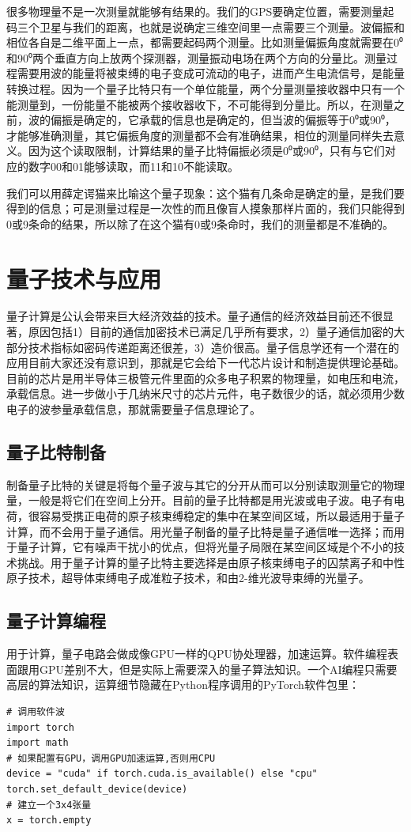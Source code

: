 \documentclass{ctexbook}
\begin{document}
很多物理量不是一次测量就能够有结果的。我们的GPS要确定位置，需要测量起码三个卫星与我们的距离，也就是说确定三维空间里一点需要三个测量。波偏振和相位各自是二维平面上一点，都需要起码两个测量。比如测量偏振角度就需要在0⁰和90⁰两个垂直方向上放两个探测器，测量振动电场在两个方向的分量比。测量过程需要用波的能量将被束缚的电子变成可流动的电子，进而产生电流信号，是能量转换过程。因为一个量子比特只有一个单位能量，两个分量测量接收器中只有一个能测量到，一份能量不能被两个接收器收下，不可能得到分量比。所以，在测量之前，波的偏振是确定的，它承载的信息也是确定的，但当波的偏振等于0⁰或90⁰，才能够准确测量，其它偏振角度的测量都不会有准确结果，相位的测量同样失去意义。因为这个读取限制，计算结果的量子比特偏振必须是0⁰或90⁰，只有与它们对应的数字00和01能够读取，而11和10不能读取。

我们可以用薛定谔猫来比喻这个量子现象：这个猫有几条命是确定的量，是我们要得到的信息；可是测量过程是一次性的而且像盲人摸象那样片面的，我们只能得到0或9条命的结果，所以除了在这个猫有0或9条命时，我们的测量都是不准确的。

\section{量子技术与应用}
量子计算是公认会带来巨大经济效益的技术。量子通信的经济效益目前还不很显著，原因包括1）目前的通信加密技术已满足几乎所有要求，2）量子通信加密的大部分技术指标如密码传递距离还很差，3）造价很高。量子信息学还有一个潜在的应用目前大家还没有意识到，那就是它会给下一代芯片设计和制造提供理论基础。目前的芯片是用半导体三极管元件里面的众多电子积累的物理量，如电压和电流，承载信息。进一步做小于几纳米尺寸的芯片元件，电子数很少的话，就必须用少数电子的波参量承载信息，那就需要量子信息理论了。

\subsection{量子比特制备}
制备量子比特的关键是将每个量子波与其它的分开从而可以分别读取测量它的物理量，一般是将它们在空间上分开。目前的量子比特都是用光波或电子波。电子有电荷，很容易受携正电荷的原子核束缚稳定的集中在某空间区域，所以最适用于量子计算，而不会用于量子通信。用光量子制备的量子比特是量子通信唯一选择；而用于量子计算，它有噪声干扰小的优点，但将光量子局限在某空间区域是个不小的技术挑战。用于量子计算的量子比特主要选择是由原子核束缚电子的囚禁离子和中性原子技术，超导体束缚电子成准粒子技术，和由2-维光波导束缚的光量子。

\subsection{量子计算编程}
用于计算，量子电路会做成像GPU一样的QPU协处理器，加速运算。软件编程表面跟用GPU差别不大，但是实际上需要深入的量子算法知识。一个AI编程只需要高层的算法知识，运算细节隐藏在Python程序调用的PyTorch软件包里：
\begin{lstlisting}
# 调用软件波
import torch
import math
# 如果配置有GPU，调用GPU加速运算,否则用CPU
device = "cuda" if torch.cuda.is_available() else "cpu"
torch.set_default_device(device)
# 建立一个3x4张量
x = torch.empty
\end{lstlisting}
\end{document}
